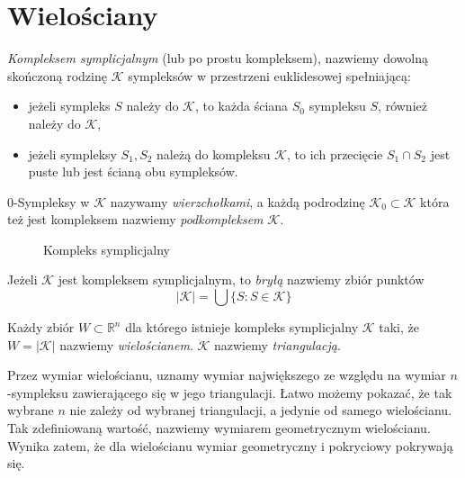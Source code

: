 \section{Wielościany}
\begin{defi}
    \emph{Kompleksem symplicjalnym} (lub po prostu kompleksem), nazwiemy dowolną skończoną rodzinę $\mathcal{K}$ sympleksów w przestrzeni euklidesowej spełniającą:
    \begin{itemize}
        \item jeżeli sympleks $S$ należy do $\mathcal{K}$, to każda ściana $S_0$ sympleksu $S$, również należy do $\mathcal{K}$,
        \item jeżeli sympleksy $S_1, S_2$ należą do kompleksu $\mathcal{K}$, to ich przecięcie $S_1 \cap S_2$ jest puste lub jest ścianą obu sympleksów.
    \end{itemize}
    0-Sympleksy w $\mathcal{K}$ nazywamy \emph{wierzchołkami}, a każdą podrodzinę $\mathcal{K}_0\subset \mathcal{K}$ która też jest kompleksem nazwiemy \emph{podkompleksem $\mathcal{K}$}.
    \begin{figure}[H]
        \centering
        
        \caption{Kompleks symplicjalny}
        \label{fig:kompl}
    \end{figure}
\end{defi}

\begin{defi}
    Jeżeli $\mathcal{K}$ jest kompleksem symplicjalnym, to \emph{bryłą} nazwiemy zbiór punktów
    \[|\mathcal{K}|=\bigcup \{S:S\in \mathcal{K}\}\]
\end{defi}

\begin{defi}
    Każdy zbiór $W\subset\mathbb{R}^n$ dla którego istnieje kompleks symplicjalny $\mathcal{K}$ taki, że $W=|\mathcal{K}|$ 
    nazwiemy \emph{wielościanem}. $\mathcal{K}$ nazwiemy \emph{triangulacją}.
\end{defi}
Przez wymiar wielościanu, uznamy wymiar 
największego ze względu na wymiar $n$-sympleksu 
zawierającego się w jego triangulacji. Łatwo możemy pokazać, że tak wybrane $n$ nie zależy od wybranej triangulacji, a jedynie od samego wielościanu. Tak zdefiniowaną wartość, nazwiemy wymiarem geometrycznym wielościanu. Wynika zatem, że dla wielościanu wymiar geometryczny i pokryciowy pokrywają się. 

